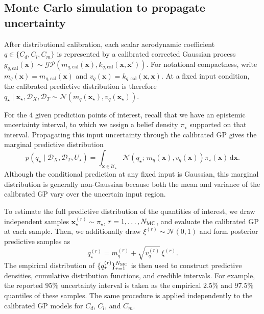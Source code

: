 \documentclass[journal]{new-aiaa}
\newcommand{\mcl}{\mathcal}
\newcommand{\x}{\mathbf{x}}
\begin{document}
\subsection{Monte Carlo simulation to propagate uncertainty}
After distributional calibration, each scalar aerodynamic coefficient
$q \in \{C_d,C_l,C_m\}$ is represented by a calibrated corrected Gaussian
process
$g_{q,\mathrm{cal}}(\mathbf{x}) \sim
\mathcal{GP}\!\left(m_{q,\mathrm{cal}}(\mathbf{x}),
k_{q,\mathrm{cal}}(\mathbf{x},\mathbf{x}')\right)$. For notational compactness, write
$m_q(\mathbf{x})=m_{q,\mathrm{cal}}(\mathbf{x})$ and
$v_q(\mathbf{x})=k_{q,\mathrm{cal}}(\mathbf{x},\mathbf{x})$. At a fixed input
condition, the calibrated predictive distribution is therefore
$q_\star \mid \mathbf{x}_\star,\mathcal{D}_X,\mathcal{D}_T
\sim \mathcal{N}\!\left(m_q(\mathbf{x}_\star),v_q(\mathbf{x}_\star)\right)$.

For the $4$ given prediction points of interest, recall that we have an epistemic uncertainty interval, to which we assign a belief density $\pi_\star$ supported on
that interval. Propagating this input uncertainty through the calibrated GP gives
the marginal predictive distribution
\[
p(q_\star \mid \mathcal{D}_X,\mathcal{D}_T,U_\star)
=
\int_{\x \in \mcl{U}_\star}
\mathcal{N}\!\left(q_\star;\,m_q(\mathbf{x}),v_q(\mathbf{x})\right)
\pi_\star(\mathbf{x})\,\mathrm{d}\mathbf{x}.
\]
Although the conditional prediction at any fixed input is Gaussian, this
marginal distribution is generally non-Gaussian because both the
mean and variance of the calibrated GP vary over the uncertain input region.

To estimate the full predictive distribution of the quantities of interest, we draw
independent samples $\mathbf{x}_\star^{(r)}\sim\pi_\star$, $r=1,\ldots,N_{\rm MC}$,
and evaluate the calibrated GP at each sample. Then,  we additionally draw $\xi^{(r)}\sim\mathcal{N}(0,1)$ and form
posterior predictive samples as
\[
q_\star^{(r)}
=
m_q^{(r)}+\sqrt{v_q^{(r)}}\,\xi^{(r)}.
\]
The empirical distribution of $\{q_\star^{(r)}\}_{r=1}^{N_{\rm MC}}$ is then
used to construct predictive densities, cumulative distribution functions, and
credible intervals. For example, the reported $95\%$ uncertainty interval is
taken as the empirical $2.5\%$ and $97.5\%$ quantiles of these samples. The same
procedure is applied independently to the calibrated GP models for $C_d$,
$C_l$, and $C_m$.
\end{document}
